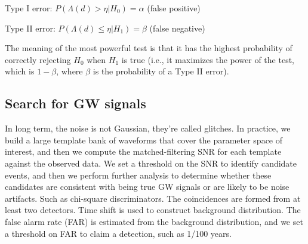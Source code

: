 \documentclass[12pt, a4paper]{article}
\theoremstyle{plain} %
\theoremstyle{definition} %
\begin{document}
Type I error: $P(\Lambda(d) > \eta | H_0) = \alpha$ (false positive)

Type II error: $P(\Lambda(d) \leq \eta | H_1) = \beta$ (false negative)

The meaning of the most powerful test is that it has the highest probability of correctly rejecting $H_0$ when $H_1$ is true (i.e., it maximizes the power of the test, which is $1 - \beta$, where $\beta$ is the probability of a Type II error).

\subsection*{Search for GW signals}
In long term, the noise is not Gaussian, they're called glitches. In practice, we build a large template bank of waveforms that cover the parameter space of interest, and then we compute the matched-filtering SNR for each template against the observed data. We set a threshold on the SNR to identify candidate events, and then we perform further analysis to determine whether these candidates are consistent with being true GW signals or are likely to be noise artifacts. Such as chi-square discriminators. The coincidences are formed from at least two detectors. Time shift is used to construct background distribution. The false alarm rate (FAR) is estimated from the background distribution, and we set a threshold on FAR to claim a detection, such as 1/100 years.
\end{document}
